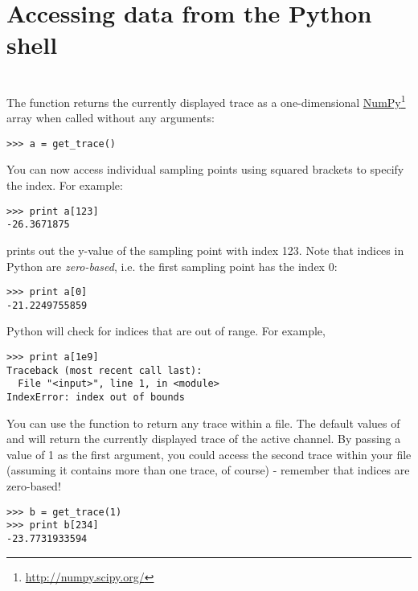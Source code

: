 \section{Accessing data from the Python shell}
\\
The  function returns the currently displayed trace as a one-dimensional \href{http://numpy.scipy.org/}{NumPy}\footnote{\url{http://numpy.scipy.org/}} array when called without any arguments:
\begin{lstlisting}
>>> a = get_trace()
\end{lstlisting}
You can now access individual sampling points using squared brackets to specify the index. For example:
\begin{lstlisting}
>>> print a[123]
-26.3671875
\end{lstlisting}
prints out the y-value of the sampling point with index 123. Note that indices in Python are \textit{zero-based}, i.e. the first sampling point has the index 0:
\begin{lstlisting}
>>> print a[0]
-21.2249755859
\end{lstlisting}
Python will check for indices that are out of range. For example,
\begin{lstlisting}
>>> print a[1e9]
Traceback (most recent call last):
  File "<input>", line 1, in <module>
IndexError: index out of bounds
\end{lstlisting}
You can use the  function to return any trace within a file. The default values of  and  will return the currently displayed trace of the active channel. By passing a value of 1 as the first argument, you could access the second trace within your file (assuming it contains more than one trace, of course) - remember that indices are zero-based!
\begin{lstlisting}
>>> b = get_trace(1)
>>> print b[234]
-23.7731933594
\end{lstlisting}


